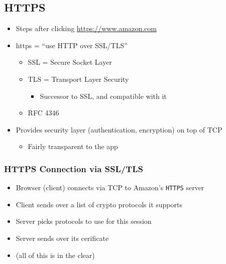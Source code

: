 \subsection{HTTPS}
\begin{itemize}[nosep]
    \item Steps after clicking \url{https://www.amazon.com}
    \item https = ``use HTTP over SSL/TLS''
          \begin{itemize}[nosep]
              \item SSL = Secure Socket Layer
              \item TLS = Transport Layer Security
                    \begin{itemize}[nosep]
                        \item Successor to SSL, and compatible with it
                    \end{itemize}
              \item RFC 4346
          \end{itemize}
    \item Provides security layer (authentication, encryption) on top of TCP
          \begin{itemize}[nosep]
              \item Fairly transparent to the app
          \end{itemize}
\end{itemize}

\subsubsection{HTTPS Connection via SSL/TLS}
\begin{itemize}[nosep]
    \item Browser (client) connects via TCP to Amazon's \texttt{HTTPS} server
    \item Client sends over a list of crypto protocols it supports
    \item Server picks protocols to use for this session
    \item Server sends over its cerificate
    \item (all of this is in the clear)
\end{itemize}

